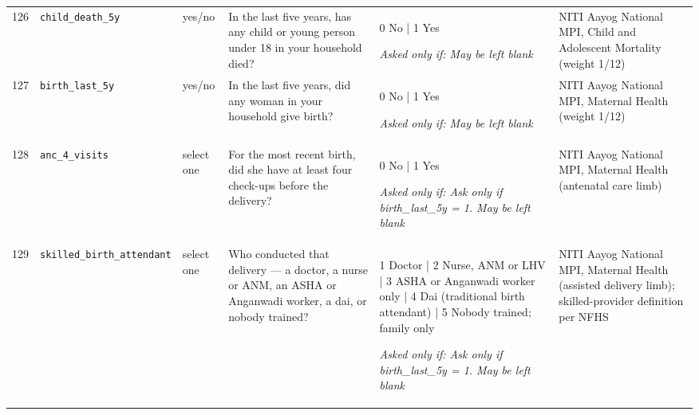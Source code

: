\documentclass[9pt,a4paper,landscape]{article}
\begin{document}
\begin{longtable}{@{}p{0.5cm}p{3.3cm}p{1.7cm}p{7.3cm}p{5.6cm}p{5.4cm}@{}}
\footnotesize 126 & \footnotesize\texttt{child\_death\_5y} & \scriptsize yes/no & \footnotesize In the last five years, has any child or young person under 18 in your household died?\par\vspace{1pt}{\footnotesize\color{hdr}{\hifont पिछले पाँच साल में क्या आपके घर के 18 साल से छोटे किसी बच्चे या किशोर की मृत्यु हुई?}} & \scriptsize 0 No | 1 Yes\par\vspace{1pt}\textit{Asked only if: May be left blank} & \scriptsize NITI Aayog National MPI, Child and Adolescent Mortality (weight 1/12)\\
\footnotesize 127 & \footnotesize\texttt{birth\_last\_5y} & \scriptsize yes/no & \footnotesize In the last five years, did any woman in your household give birth?\par\vspace{1pt}{\footnotesize\color{hdr}{\hifont पिछले पाँच साल में क्या आपके घर की किसी महिला ने बच्चे को जन्म दिया?}} & \scriptsize 0 No | 1 Yes\par\vspace{1pt}\textit{Asked only if: May be left blank} & \scriptsize NITI Aayog National MPI, Maternal Health (weight 1/12)\\
\footnotesize 128 & \footnotesize\texttt{anc\_4\_visits} & \scriptsize select one & \footnotesize For the most recent birth, did she have at least four check-ups before the delivery?\par\vspace{1pt}{\footnotesize\color{hdr}{\hifont सबसे हाल के जन्म के लिए, क्या डिलीवरी से पहले उनकी कम से कम चार बार जाँच हुई थी?}} & \scriptsize 0 No | 1 Yes\par\vspace{1pt}\textit{Asked only if: Ask only if birth\_last\_5y = 1. May be left blank} & \scriptsize NITI Aayog National MPI, Maternal Health (antenatal care limb)\\
\footnotesize 129 & \footnotesize\texttt{skilled\_birth\_attendant} & \scriptsize select one & \footnotesize Who conducted that delivery — a doctor, a nurse or ANM, an ASHA or Anganwadi worker, a dai, or nobody trained?\par\vspace{1pt}{\footnotesize\color{hdr}{\hifont वह डिलीवरी किसने कराई — डॉक्टर, नर्स या एएनएम, आशा या आँगनवाड़ी कार्यकर्ता, दाई, या कोई प्रशिक्षित व्यक्ति नहीं?}} & \scriptsize 1 Doctor | 2 Nurse, ANM or LHV | 3 ASHA or Anganwadi worker only | 4 Dai (traditional birth attendant) | 5 Nobody trained; family only\par\vspace{1pt}\textit{Asked only if: Ask only if birth\_last\_5y = 1. May be left blank} & \scriptsize NITI Aayog National MPI, Maternal Health (assisted delivery limb); skilled-provider definition per NFHS\\
\bottomrule\end{longtable}\vspace{6pt}
\end{document}
